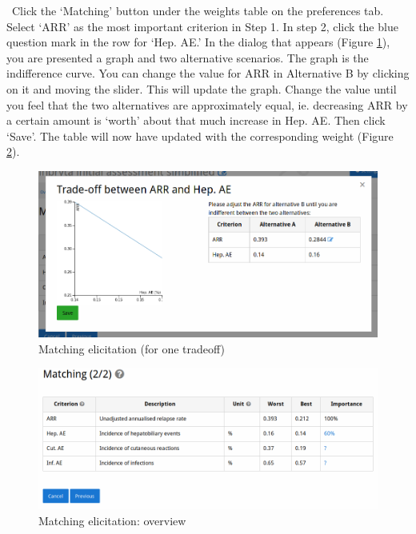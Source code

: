 \documentclass[00_mcda_tutorial.tex]{subfiles}
\begin{document}
\noindent \leftpointright \, Click the ‘Matching’ button under the weights table on the preferences tab. Select ‘ARR’ as the most important criterion in Step 1. In step 2, click the blue question mark in the row for ‘Hep. AE.’ In the dialog that appears (Figure \ref{fig:matching1}), you are presented a graph and two alternative scenarios. The graph is the indifference curve. You can change the value for ARR in Alternative B by clicking on it and moving the slider. This will update the graph. Change the value until you feel that the two alternatives are approximately equal, ie. decreasing ARR by a certain amount is ‘worth’ about that much increase in Hep. AE. Then click ‘Save’. The table will now have updated with the corresponding weight (Figure \ref{fig:matching2}).
\newline

\begin{figure}[!h]
    \centering
	\includegraphics[width=\textwidth]{fig/matching1.png}
    \caption{Matching elicitation (for one tradeoff)}
	\label{fig:matching1}
\end{figure}

\begin{figure}[!h]
    \centering
	\includegraphics[width=\textwidth]{fig/matching2.png}
    \caption{Matching elicitation: overview}
	\label{fig:matching2}
\end{figure}
\end{document}
